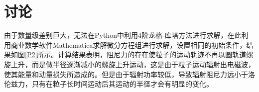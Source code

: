 \documentclass{article} %
\begin{document}
\section{讨论}
由于数量级差别巨大，无法在Python中利用4阶龙格-库塔方法进行求解，在此利用商业数学软件Mathematica求解微分方程组进行求解，设置相同的初始条件，结果如图\ref{P2}所示。计算结果表明，阻尼力的存在使粒子的运动轨迹不再以圆轨道螺旋上升，而是做半径逐渐减小的螺旋上升运动，这是由于粒子运动辐射出电磁波，使其能量和动量损失所造成的。但是由于辐射功率较低，导致辐射阻尼力远小于洛伦兹力，只有在粒子长时间运动后其运动的半径才会有明显的变化。
\begin{figure}[t]
  \begin{center}

\end{center}
\end{figure}
\end{document}
